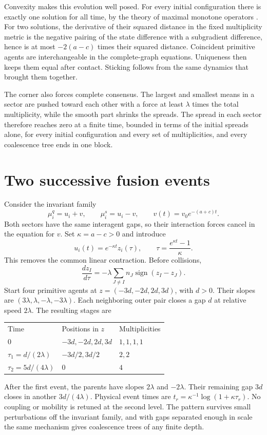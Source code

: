 Convexity makes this evolution well posed. For every initial configuration there is exactly one solution for all time, by the theory of maximal monotone operators \citep{Brezis1973}. For two solutions, the derivative of their squared distance in the fixed multiplicity metric is the negative pairing of the state difference with a subgradient difference, hence is at most $-2(a-c)$ times their squared distance. Coincident primitive agents are interchangeable in the complete-graph equations. Uniqueness then keeps them equal after contact. Sticking follows from the same dynamics that brought them together.

The corner also forces complete consensus. The largest and smallest means in a sector are pushed toward each other with a force at least $\lambda$ times the total multiplicity, while the smooth part shrinks the spreads. The spread in each sector therefore reaches zero at a finite time, bounded in terms of the initial spreads alone, for every initial configuration and every set of multiplicities, and every coalescence tree ends in one block.

\section{Two successive fusion events}

Consider the invariant family
\begin{equation}
\mu_i^q=u_i+v,\qquad \mu_i^s=u_i-v,\qquad
v(t)=v_0e^{-(a+c)t}.
\end{equation}
Both sectors have the same interagent gaps, so their interaction forces cancel in the equation for $v$. Set $\kappa=a-c>0$ and introduce
\begin{equation}
u_i(t)=e^{-\kappa t}z_i(\tau),\qquad
\tau=\frac{e^{\kappa t}-1}{\kappa}.
\end{equation}
This removes the common linear contraction. Before collisions,
\begin{equation}
\frac{dz_I}{d\tau}=-\lambda\sum_{J\ne I}n_J\operatorname{sign}(z_I-z_J).
\end{equation}
Start four primitive agents at $z=(-3d,-2d,2d,3d)$, with $d>0$. Their slopes are $(3\lambda,\lambda,-\lambda,-3\lambda)$. Each neighboring outer pair closes a gap $d$ at relative speed $2\lambda$. The resulting stages are
\begin{center}
\begin{tabular}{lll}
Time & Positions in $z$ & Multiplicities\\
$0$ & $-3d,-2d,2d,3d$ & $1,1,1,1$\\
$\tau_1=d/(2\lambda)$ & $-3d/2,3d/2$ & $2,2$\\
$\tau_2=5d/(4\lambda)$ & $0$ & $4$
\end{tabular}
\end{center}
After the first event, the parents have slopes $2\lambda$ and $-2\lambda$. Their remaining gap $3d$ closes in another $3d/(4\lambda)$. Physical event times are $t_r=\kappa^{-1}\log(1+\kappa\tau_r)$. No coupling or mobility is retuned at the second level. The pattern survives small perturbations off the invariant family, and with gaps separated enough in scale the same mechanism gives coalescence trees of any finite depth.

